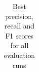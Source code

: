 \documentclass[11pt]{scrreprt}
\begin{document}
\begin{table}
\begin{tabular}{lllrrrrr}
\bottomrule
\end{tabular}
\caption{Best precision, recall and F1 scores for all evaluation runs}
\label{tab:quant-results}
\end{table}
\end{document}

